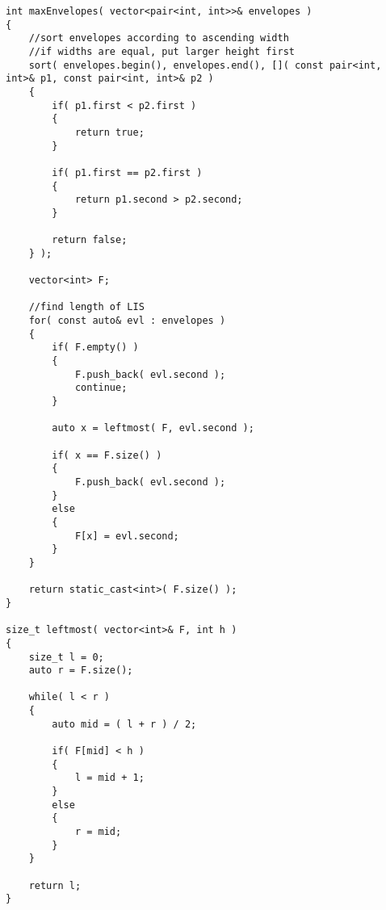 \setcounter{lstlisting}{0}
\begin{lstlisting}[style=customc, caption={LIS}]
int maxEnvelopes( vector<pair<int, int>>& envelopes )
{
    //sort envelopes according to ascending width
    //if widths are equal, put larger height first
    sort( envelopes.begin(), envelopes.end(), []( const pair<int, int>& p1, const pair<int, int>& p2 )
    {
        if( p1.first < p2.first )
        {
            return true;
        }

        if( p1.first == p2.first )
        {
            return p1.second > p2.second;
        }

        return false;
    } );

    vector<int> F;

    //find length of LIS
    for( const auto& evl : envelopes )
    {
        if( F.empty() )
        {
            F.push_back( evl.second );
            continue;
        }

        auto x = leftmost( F, evl.second );

        if( x == F.size() )
        {
            F.push_back( evl.second );
        }
        else
        {
            F[x] = evl.second;
        }
    }

    return static_cast<int>( F.size() );
}

size_t leftmost( vector<int>& F, int h )
{
    size_t l = 0;
    auto r = F.size();

    while( l < r )
    {
        auto mid = ( l + r ) / 2;

        if( F[mid] < h )
        {
            l = mid + 1;
        }
        else
        {
            r = mid;
        }
    }

    return l;
}

\end{lstlisting}